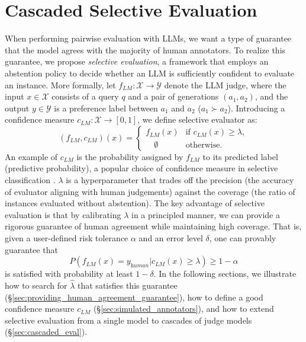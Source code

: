 \section{Cascaded Selective Evaluation}
When performing pairwise evaluation with LLMs, we want a type of guarantee that the model agrees with the majority of human annotators. To realize this guarantee, we propose \textit{selective evaluation}, a framework that employs an abstention policy to decide whether an LLM is sufficiently confident to evaluate an instance. More formally, let $f_\textit{LM}: \mathcal{X} \rightarrow \mathcal{Y}$ denote the LLM judge, where the input $x \in \mathcal{X}$ consists of a query $q$ and a pair of generations $(a_1, a_2)$, and the output $y \in \mathcal{Y}$ is a preference label between $a_1$ and $a_2$ (\eg $a_1 \succ a_2$). 
Introducing a confidence measure $c_\textit{LM}: \mathcal{X} \rightarrow [0, 1]$, we define selective evaluator as:
\begin{equation}\label{eq:selective_evaluator}
    (f_\textit{LM}, c_\textit{LM})(x) = \begin{cases}
        f_\textit{LM}(x) & \text{if } c_\textit{LM}(x) \ge \lambda, \\
        \quad\emptyset & \text{otherwise}.
    \end{cases}
\end{equation}
An example of $c_\textit{LM}$ is the probability assigned by $f_\textit{LM}$ to its predicted label (predictive probability), a popular choice of confidence measure in selective classification \citep{selective-classification}. $\lambda$ is a hyperparameter that trades off the precision (\ie the accuracy of evaluator aligning with human judgements) against the coverage (\ie the ratio of instances evaluated without abstention). The key advantage of selective evaluation is that by calibrating $\lambda$ in a principled manner, we can provide a rigorous guarantee of human agreement while maintaining high coverage. That is, given a user-defined risk tolerance $\alpha$ and an error level $\delta$, one can provably guarantee that
\begin{equation}\label{eq:human-agreement-guarantee}
    P(f_\textit{LM}(x)=y_\textit{human} | c_\textit{LM}(x) \ge \lambda) \ge 1 - \alpha
\end{equation}
is satisfied with probability at least $1 - \delta$. In the following sections, we illustrate how to search for $\widehat{\lambda}$ that satisfies this guarantee (\S\ref{sec:providing_human_agreement_guarantee}), how to define a good confidence measure $c_\textit{LM}$ (\S\ref{sec:simulated_annotators}), and how to extend selective evaluation from a single model to cascades of judge models (\S\ref{sec:cascaded_eval}).

